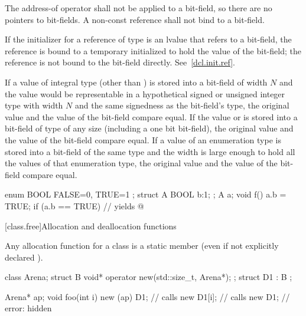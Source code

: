 \pnum
{}%
The address-of operator \tcode{\&} shall not be applied to a bit-field,
so there are no pointers to bit-fields.
%
%
%
A non-const reference shall not bind to a bit-field.
\begin{note}
If the initializer for a reference of type   is
an lvalue that refers to a bit-field, the reference is bound to a
temporary initialized to hold the value of the bit-field; the reference
is not bound to the bit-field directly. See~\ref{dcl.init.ref}.
\end{note}

\pnum
If a value of integral type (other than ) is stored
into a bit-field of width $N$ and the value would be representable
in a hypothetical signed or unsigned integer type
with width $N$ and the same signedness as the bit-field's type,
the original value and the value of the bit-field compare equal.
If the value  or  is stored into a bit-field of
type  of any size (including a one bit bit-field), the
original  value and the value of the bit-field compare
equal. If a value of an enumeration type is stored into a bit-field of the
same type and the width is large
enough to hold all the values of that enumeration type,
the original value and the value of the bit-field compare equal.
\begin{example}
\begin{codeblock}
enum BOOL { FALSE=0, TRUE=1 };
struct A {
  BOOL b:1;
};
A a;
void f() {
  a.b = TRUE;
  if (a.b == TRUE)              // yields 
    { @\commentellip@ }
}
\end{codeblock}
\end{example}

[class.free]{Allocation and deallocation functions}%
%

\pnum
{}%
%
Any allocation function for a class
is a static member (even if not explicitly declared
).

\pnum
\begin{example}
\begin{codeblock}
class Arena;
struct B {
  void* operator new(std::size_t, Arena*);
};
struct D1 : B {
};

Arena*  ap;
void foo(int i) {
  new (ap) D1;      // calls 
  new D1[i];        // calls 
  new D1;           // error:  hidden
}
\end{codeblock}
\end{example}

